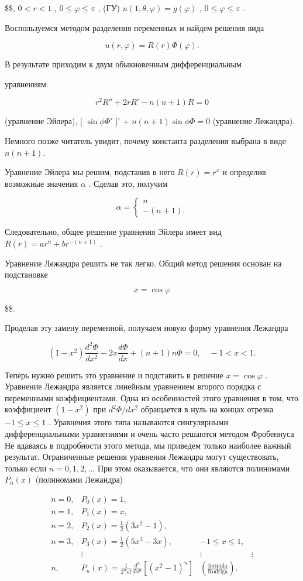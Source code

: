 \documentclass[
  ukrainian,
]{article}
\begin{document}
\$\$, \(0 < r < 1\) , \(0 \le \varphi \le \pi\) , (ГУ)
\(u(1, \theta, \varphi) = g(\varphi)\) , \(0 \le \varphi \le \pi\) .

Воспользуемся методом разделення переменных и найдем решения вида

\[
u(r, \varphi) = R(r) \Phi(\varphi).
\]

В результате приходим к двум обыкновенным дифференциальным

уравнениям:

\[
r^2R'' + 2rR' - n(n+1)R = 0
\]

(уравнение Эйлера), {[} \(\sin \phi \Phi'\) {]}' +
\(n(n+1)\sin \phi \Phi = 0\) (уравнение Лежандра).

Немного позже читатель увидит, почему константа разделения выбрана в
виде \(n(n+1)\).

Уравнение Эйлера мы решим, подставив в него \(R(r) = r^x\) и определив
возможные значения \(\alpha\) . Сделав это, получим

\[
\alpha = \begin{cases} n \\ -(n+1). \end{cases}
\]

Следовательно, общее решение уравнения Эйлера имеет вид
\(R(r) = ar^n + br^{-(n+1)}\) .

Уравнение Лежандра решить не так легко. Общий метод решения основан на
подстановке

\[
x = \cos \varphi
\]

\$\$.

Проделав эту замену переменной, получаем новую форму уравнения Лежандра

\[
(1-x^2)\frac{d^2\Phi}{dx^2} - 2x\frac{d\Phi}{dx} + (n+1)n\Phi = 0, \quad -1 < x < 1.
\]

Теперь нужно решить это уравнение и подставить в решение
\(x = \cos \varphi\) . Уравнение Лежандра является линейным уравнением
вгорого порядка с переменными коэффициентами. Одна из особенностей этого
уравнения в том, что коэффициент \((1-x^2)\) при \(d^2\Phi/dx^2\)
обращается в нуль на концах отрезка \(-1 \leqslant x \leqslant 1\) .
Уравнения этого типа называются сингулярными дифференциальными
уравнениями и очень часто решаются методом Фробеннуса Не вдаваясь в
подробности этого метода, мы приведем только наиболее важный результат.
Ограниченные решения уравнения Лежандра могут существовать, только если
\(n=0,1,2,\ldots\) При этом оказывается, что они являются полиномами
\(P_n(x)\) (полиномами Лежандра)

\[
\begin{array}{lll} n=0, & P_{0}(x)=1, \\ n=1, & P_{1}(x)=x, \\ n=2, & P_{2}(x)=\frac{1}{2}(3x^{2}-1), \\ n=3, & P_{3}(x)=\frac{1}{2}(5x^{3}-3x), & -1\leqslant x\leqslant 1, \\ & \vdots & \vdots & \vdots \\ n, & P_{n}(x)=\frac{1}{2^{n}n!}\frac{d^{n}}{dx^{n}}[(x^{2}-1)^{n}] & \left(\frac{\text{formula}}{\text{Rodriga}}\right). \end{array}
\]
\end{document}
